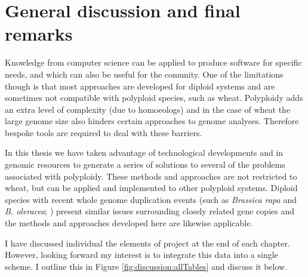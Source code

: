 
\chapter[General discussion]{General discussion and final remarks}
\glsresetall
\label{cha:discussion}



Knowledge from  computer science can be applied to produce software for specific needs, and which can also be useful for the comunity. 
One of the limitations though is that most approaches are developed for diploid systems and are sometimes not compatible with polyploid species, such as wheat. 
Polyploidy adds an extra level of complexity (due to homoeologs) and in the case of wheat the large genome size also hinders certain approaches to genome analyses. Therefore bespoke tools are required to deal with these barriers. 

In this thesis we have taken advantage of technological developments and in genomic resources to generate a series of solutions to several of the problems associated with polyploidy. These methods and approaches are not restricted to wheat, but can be applied and implemented to other polyploid systems.
Diploid species with recent whole genome duplication events (such as \textit{Brassica rapa} and \textit{B. oleracea}; \citealt{Cheng2014}) present similar issues surrounding closely related gene copies and the methods and approaches developed here are likewise applicable.

I have discussed individual the elements of project at the end of each chapter. However, looking forward my interest is to integrate this data into a single scheme. I outline this in Figure \ref{fig:discussion:allTables} and discuss it below. 


